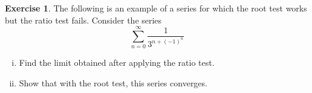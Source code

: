 \documentclass[12pt]{article}
\theoremstyle{plain}
\theoremstyle{definition}
\newtheorem{Ej}[Th]{Exercise}         %
\theoremstyle{remark}
\renewcommand{\:}{\colon}           %
\renewcommand{\.}{\Cdot}                %
\begin{document}
\begin{multicols}{2}
\begin{Ej}
  The following is an example of a series for which the root test works but the ratio test fails. Consider the series
  $$\sum_{n=0}^\infty\frac{1}{3^{n+(-1)^n}}$$
  \vspace*{-0.4em}
  \begin{enumerate}[i)]
    \itemsep=-0.4em
    \item Find the limit obtained after applying the ratio test.
    \item Show that with the root test, this series converges. %
  \end{enumerate}
\end{Ej}
\end{multicols}
\end{document}
